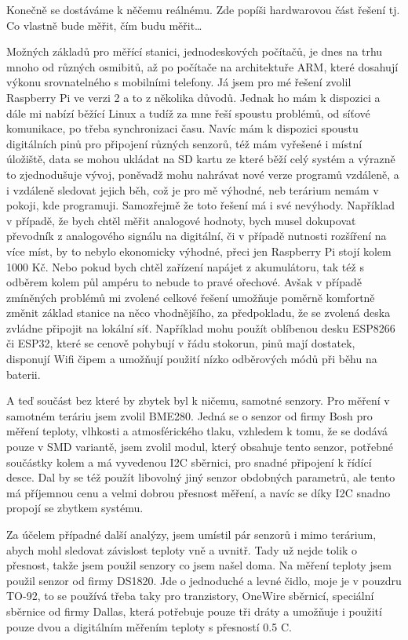 Konečně se dostáváme k něčemu reálnému. Zde popíši hardwarovou část řešení tj. Co vlastně bude měřit, čím budu 
měřit\ldots

Možných základů pro měřící stanici, jednodeskových počítačů, je dnes na trhu mnoho od různých osmibitů, až po počítače 
na architektuře ARM,  které dosahují výkonu srovnatelného s mobilními telefony. Já jsem pro mé řešení zvolil Raspberry 
Pi ve verzi 2 a to z několika důvodů. Jednak ho mám k dispozici a dále mi nabízí běžící Linux a tudíž za mne řeší 
spoustu problémů, od síťové komunikace, po třeba synchronizaci času. Navíc mám k dispozici spoustu digitálních pinů pro 
připojení různých senzorů, též mám vyřešené i místní úložiště, data se mohou ukládat na SD kartu ze které běží celý 
systém a výrazně to zjednodušuje vývoj, poněvadž mohu nahrávat nové verze programů vzdáleně, a i vzdáleně sledovat 
jejich běh, což je pro mě výhodné, neb terárium nemám v pokoji, kde programuji. Samozřejmě že toto řešení má i své 
nevýhody. Například v případě, že bych chtěl měřit analogové hodnoty, bych musel dokupovat převodník z analogového 
signálu na digitální, či v případě nutnosti rozšíření na více míst, by to nebylo ekonomicky výhodné, přeci jen Raspberry 
Pi stojí kolem 1000 Kč. Nebo pokud bych chtěl zařízení napájet z akumulátoru, tak též s odběrem kolem půl ampéru to 
nebude to pravé ořechové. Avšak v případě zmíněných problémů mi zvolené celkové řešení umožňuje poměrně komfortně změnit 
základ stanice na něco vhodnějšího, za předpokladu, že se zvolená deska zvládne připojit na lokální síť. Například mohu 
použít oblíbenou desku ESP8266 či ESP32, které se cenově pohybují v řádu stokorun, pinů mají dostatek, disponují Wifi 
čipem a umožňují použití nízko odběrových módů při běhu na baterii.

A teď součást bez které by zbytek byl k ničemu, samotné senzory. Pro měření v samotném teráriu jsem zvolil BME280. Jedná 
se o senzor od firmy Bosh pro měření teploty, vlhkosti a atmosférického tlaku, vzhledem k tomu, že se dodává pouze v SMD 
variantě, jsem zvolil modul, který obsahuje tento senzor, potřebné součástky kolem a má vyvedenou I2C sběrnici, pro 
snadné připojení k řídící desce. Dal by se též použít libovolný jiný senzor obdobných parametrů, ale tento má příjemnou 
cenu a velmi dobrou přesnost měření, a navíc se díky I2C snadno propojí se zbytkem systému.

Za účelem případné další analýzy, jsem umístil pár senzorů i mimo terárium, abych mohl sledovat závislost teploty vně 
a uvnitř. Tady už nejde tolik o přesnost, takže jsem použil senzory co jsem našel doma. Na měření teploty jsem použil 
senzor od firmy DS1820. Jde o jednoduché a levné čidlo, moje je v pouzdru TO-92, to se používá třeba taky pro 
tranzistory, OneWire sběrnicí, speciální sběrnice od firmy Dallas, která potřebuje pouze tři dráty a umožňuje i použití 
pouze dvou a digitálním měřením teploty s přesností 0.5 \textdegree C.

